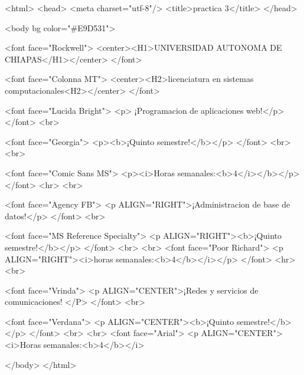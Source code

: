 <html>
	<head>
	<meta charset="utf-8"/>
	<title>practica 3</title>
	</head>
		
		<body bg color="#E9D531">
		
		<font face="Rockwell">
		<center><H1>UNIVERSIDAD AUTONOMA DE CHIAPAS</H1></center>
		</font>
			
		<font face="Colonna MT">
		<center><H2>licenciatura en sistemas computacionales<H2></center>
		</font>
		
		<font face="Lucida Bright">
		<p> ¡Programacion de aplicaciones web!</p>
		</font>
		<br>
		
		<font face="Georgia">
		<p><b>¡Quinto semestre!</b></p>
		</font>
		<br>
		<br>
		
		<font face="Comic Sans MS">
		<p><i>Horas semanales:<b>4</i></b></p>
		</font>
		<hr>
		<br>
		
		<font face="Agency FB">
		<p ALIGN="RIGHT">¡Administracion de base de datos!</p>
		</font>
		<br>
		
		<font face="MS Reference Specialty">
		<p ALIGN="RIGHT"><b>¡Quinto semestre!</b></p>
		</font>
		<br>
		<br>
		<font face="Poor Richard">
		<p ALIGN="RIGHT"><i>horas semanales:<b>4</b></i></p>
		</font>
		<hr>
		<br>
		
		<font face="Vrinda">
		<p ALIGN="CENTER">¡Redes y servicios de comunicaciones! </P>
		</font>
		<br>

		<font face="Verdana">
		<p ALIGN="CENTER"><b>¡Quinto semestre!</b></p>
		</font>
		<br>
		<br>
		<font face="Arial">
		<p ALIGN="CENTER"><i>Horas semanales:<b>4</b></i>
		

		</body>
</html>
